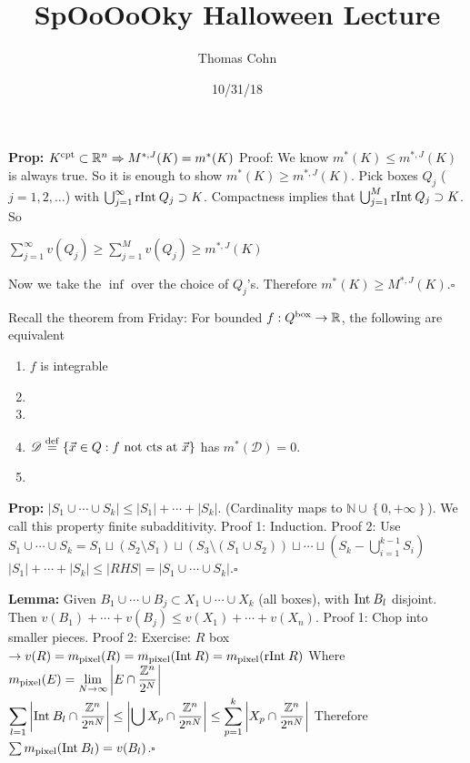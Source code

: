 \documentclass[10pt,letterpaper]{article}
\author{Thomas Cohn}
\title{SpOoOoOky Halloween Lecture}
\date{10/31/18} %
\newcommand{\n}{\hfill\break}
\newcommand{\lemma}[1]{\par\noindent\settowidth{\hangindent}{\textbf{Lemma: }}\textbf{Lemma: }#1}
\newcommand{\prop}[1]{\par\noindent\settowidth{\hangindent}{\textbf{Prop: }}\textbf{Prop: }#1\n}
\newcommand{\proven}{\;$\square$\n}
\newcommand{\ptxt}[1]{\textrm{\textnormal{#1}}}
\newcommand{\inlineeq}[1]{\centerline{$\displaystyle #1$}}
\newcommand{\card}[1]{\left|#1\right|}
\newcommand{\set}[1]{\left\{#1\right\}}
\newcommand{\naturals}{\mathbb{N}}
\newcommand{\N}{\naturals}
\newcommand{\integers}{\mathbb{Z}}
\newcommand{\Z}{\integers}
\newcommand{\reals}{\mathbb{R}}
\newcommand{\R}{\reals}
\newcommand{\Int}{\ptxt{Int}\>}
\newcommand{\rInt}{\ptxt{rInt}\>}
\begin{document}
\maketitle
\setlength\RaggedRightParindent{\parindent}
\RaggedRight

\prop{$K^{\ptxt{cpt}}\subset\R^{n}\Rightarrow{}M^{*,J}(K)=m^{*}(K)$\n
Proof: We know $m^{*}(K)\le{}m^{*,J}(K)$ is always true. So it is enough to show $m^{*}(K)\ge{}m^{*,J}(K)$.\n
Pick boxes $Q_{j}$ ($j=1,2,\ldots$) with $\bigcup_{j=1}^{\infty}\rInt{}Q_{j}\supset{}K$.\n
Compactness implies that $\bigcup_{j=1}^{M}\rInt{}Q_{j}\supset{}K$. So\n
\inlineeq{\sum_{j=1}^{\infty}v(Q_{j})\ge\sum_{j=1}^{M}v(Q_{j})\ge{}m^{*,J}(K)}\n
Now we take the $\inf$ over the choice of $Q_{j}$'s.\n
Therefore $m^{*}(K)\ge{}M^{*,J}(K)$.\proven}

\par\noindent Recall the theorem from Friday:\n
For bounded $f:Q^{\ptxt{box}}\to\R$, the following are equivalent\n
\begin{enumerate}
	\item $f$ is integrable
	\item 
	\item 
	\item $\mathscr{D}\overset{\ptxt{def}}{=}\set{\vec{x}\in{}Q:f\ptxt{ not cts at }\vec{x}}$ has $m^{*}(\mathscr{D})=0$.
	\item 
\end{enumerate}

\prop{$\card{S_{1}\cup\cdots\cup{}S_{k}}\le\card{S_{1}}+\cdots+\card{S_{k}}$. (Cardinality maps to $\N\cup\set{0,+\infty}$).\n
We call this property finite subadditivity.\n
Proof 1: Induction.\n
Proof 2: Use $S_{1}\cup\cdots\cup{}S_{k}=S_{1}\sqcup(S_{2}\setminus{}S_{1})\sqcup(S_{3}\setminus(S_{1}\cup{}S_{2}))\sqcup\cdots\sqcup(S_{k}-\bigcup_{i=1}^{k-1}S_{i})$\n
$\card{S_{1}}+\cdots+\card{S_{k}}\le\card{RHS}=\card{S_{1}\cup\cdots\cup{}S_{k}}$.\proven}

\lemma{Given $B_{1}\cup\cdots\cup{}B_{j}\subset{}X_{1}\cup\cdots\cup{}X_{k}$ (all boxes), with $\Int{}B_{l}$ disjoint.\n
Then $v(B_{1})+\cdots+v(B_{j})\le{}v(X_{1})+\cdots+v(X_{n})$.\n
Proof 1: Chop into smaller pieces.\n
Proof 2: Exercise: $R$ box $\to{}v(R)=m_{\ptxt{pixel}}(R)=m_{\ptxt{pixel}}(\Int{}R)=m_{\ptxt{pixel}}(\rInt{}R)$\n
Where $\displaystyle{}m_{\ptxt{pixel}}(E)=\lim_{N\to\infty}\card{E\cap\frac{\Z^{n}}{2^{N}}}$\n
\n
$\displaystyle\sum_{l=1}\card{\Int{}B_{l}\cap\frac{\Z^{n}}{2^{nN}}}\le\card{\bigcup{}X_{p}\cap\frac{\Z^{n}}{2^{nN}}}\le\sum_{p=1}^{k}\card{X_{p}\cap\frac{\Z^{n}}{2^{nN}}}$\n
\n
Therefore $\sum{}m_{\ptxt{pixel}}(\Int{}B_{l})=v(B_{l})$.\proven}
\end{document}
